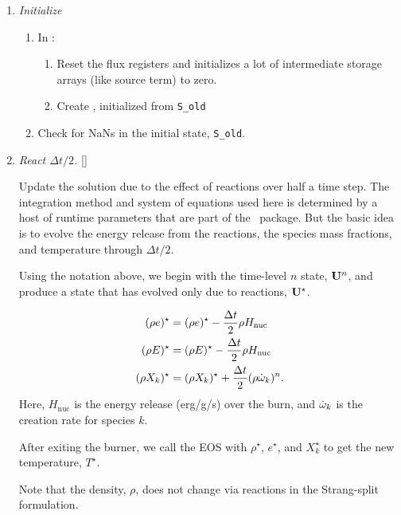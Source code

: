 \begin{enumerate}
\item \label{strang:init} {\em Initialize}

  \begin{enumerate}
  \item In  :
    \begin{enumerate}
    \item Reset the flux registers and initializes a lot of
      intermediate storage arrays (like source term) to zero.

    \item Create , initialized from {\tt S\_old}
    \end{enumerate}

  \item Check for NaNs in the initial state, {\tt S\_old}.
  \end{enumerate}

\item {\em React $\Delta t/2$.} []

  Update the solution due to the effect of reactions over half a time
  step.  The integration method and system of equations used here is
  determined by a host of runtime parameters that are part of the
  \microphysics\ package.  But the basic idea is to evolve the energy
  release from the reactions, the species mass fractions, and
  temperature through $\Delta t/2$.

  Using the notation above, we begin with the time-level $n$ state,
  ${\bf U}^n$, and produce a state that has evolved only due to reactions,
  ${\bf U}^\star$.

  \begin{align}
    (\rho e)^\star &= (\rho e)^\star - \frac{\Delta t}{2} \rho H_\mathrm{nuc} \\
    (\rho E)^\star &= (\rho E)^\star - \frac{\Delta t}{2} \rho H_\mathrm{nuc} \\
    (\rho X_k)^\star &= (\rho X_k)^\star + \frac{\Delta t}{2}(\rho\dot\omega_k)^n.
  \end{align}
  Here, $H_\mathrm{nuc}$ is the energy release (erg/g/s) over the
  burn, and $\dot\omega_k$ is the creation rate for species $k$.

  After exiting the burner, we call the EOS with $\rho^\star$,
  $e^\star$, and $X_k^\star$ to get the new temperature, $T^\star$.

  Note that the density, $\rho$, does not change via reactions in the
  Strang-split formulation.


\end{enumerate}
